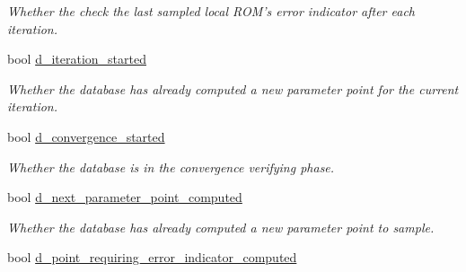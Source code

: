 \begin{DoxyCompactItemize}
\begin{DoxyCompactList}\small\item\em Whether the check the last sampled local R\-O\-M's error indicator after each iteration. \end{DoxyCompactList}\item 
\hypertarget{class_c_a_r_o_m_1_1_greedy_parameter_point_sampler_aa19524dde1add5168f3826d280a56074}{bool \hyperlink{class_c_a_r_o_m_1_1_greedy_parameter_point_sampler_aa19524dde1add5168f3826d280a56074}{d\-\_\-iteration\-\_\-started}}\label{class_c_a_r_o_m_1_1_greedy_parameter_point_sampler_aa19524dde1add5168f3826d280a56074}

\begin{DoxyCompactList}\small\item\em Whether the database has already computed a new parameter point for the current iteration. \end{DoxyCompactList}\item 
\hypertarget{class_c_a_r_o_m_1_1_greedy_parameter_point_sampler_abf9531fa742681efdcf19c9a5be6442b}{bool \hyperlink{class_c_a_r_o_m_1_1_greedy_parameter_point_sampler_abf9531fa742681efdcf19c9a5be6442b}{d\-\_\-convergence\-\_\-started}}\label{class_c_a_r_o_m_1_1_greedy_parameter_point_sampler_abf9531fa742681efdcf19c9a5be6442b}

\begin{DoxyCompactList}\small\item\em Whether the database is in the convergence verifying phase. \end{DoxyCompactList}\item 
\hypertarget{class_c_a_r_o_m_1_1_greedy_parameter_point_sampler_a9005222e2ac0acffec22047fb5ddc1ce}{bool \hyperlink{class_c_a_r_o_m_1_1_greedy_parameter_point_sampler_a9005222e2ac0acffec22047fb5ddc1ce}{d\-\_\-next\-\_\-parameter\-\_\-point\-\_\-computed}}\label{class_c_a_r_o_m_1_1_greedy_parameter_point_sampler_a9005222e2ac0acffec22047fb5ddc1ce}

\begin{DoxyCompactList}\small\item\em Whether the database has already computed a new parameter point to sample. \end{DoxyCompactList}\item 
\hypertarget{class_c_a_r_o_m_1_1_greedy_parameter_point_sampler_a74894a938aacfe34c13d62efc3699668}{bool \hyperlink{class_c_a_r_o_m_1_1_greedy_parameter_point_sampler_a74894a938aacfe34c13d62efc3699668}{d\-\_\-point\-\_\-requiring\-\_\-error\-\_\-indicator\-\_\-computed}}\label{class_c_a_r_o_m_1_1_greedy_parameter_point_sampler_a74894a938aacfe34c13d62efc3699668}


\end{DoxyCompactItemize}
